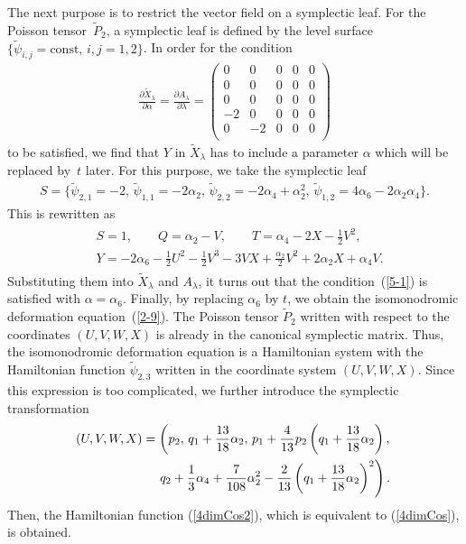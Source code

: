 \documentclass[pdftex]{sigma}
\numberwithin{equation}{section}
\begin{document}
The next purpose is to restrict the vector f\/ield on a symplectic leaf. For the Poisson tensor~$\widetilde{P}_2$, a symplectic leaf is def\/ined by the level surface $\{ \widetilde{\psi}_{i,j} = \text{const},\, i,j=1,2\}$. In order for the condition
\begin{gather}
\frac{\partial \widetilde{X}_\lambda }{\partial \alpha } = \frac{\partial A_\lambda }{\partial \lambda } =\left(
\begin{matrix}
0 & 0 & 0 & 0 & 0 \\
0 & 0 & 0 & 0 & 0 \\
0 & 0 & 0 & 0 & 0 \\
-2 & 0 & 0 & 0 & 0 \\
0 & -2 & 0 & 0 & 0 \\
\end{matrix}\right)\label{5-1}
\end{gather}
to be satisf\/ied, we f\/ind that $Y$ in $\widetilde{X}_\lambda $ has to include a parameter $\alpha $ which will be replaced by~$t$ later. For this purpose, we take the symplectic leaf
\begin{gather*}
S = \big\{ \widetilde{\psi}_{2,1} = -2,\, \widetilde{\psi}_{1,1} = -2\alpha _2,\,\widetilde{\psi}_{2,2} = -2\alpha _4 + \alpha _2^2,\, \widetilde{\psi}_{1,2} = 4\alpha _6 - 2\alpha _2\alpha _4\big \}.
\end{gather*}
This is rewritten as
\begin{gather*}
\begin{split}
& S = 1,\qquad Q = \alpha _2-V,\qquad T = \alpha _4-2X-\frac{1}{2}V^2, \\
& Y = -2\alpha _6-\frac{1}{2}U^2 - \frac{1}{2}V^3 - 3VX + \frac{\alpha _2}{2}V^2 + 2\alpha _2X + \alpha _4V.
\end{split}
\end{gather*}
Substituting them into $\widetilde{X}_\lambda $ and $A_\lambda $, it turns out that the condition~(\ref{5-1}) is satisf\/ied with $\alpha =\alpha _6$. Finally, by replacing $\alpha _6$ by $t$, we obtain the isomonodromic deformation equation~(\ref{2-9}). The Poisson tensor $\widetilde{P}_2$ written with respect to the coordinates $(U,V,W,X)$ is already in the canonical symplectic matrix. Thus, the isomonodromic deformation equation is a Hamiltonian system with the Hamiltonian function $\widetilde{\psi}_{2,3}$ written in the coordinate system $(U,V,W,X)$. Since this expression is too complicated, we further introduce the symplectic transformation
\begin{gather*}
 (U,V,W,X) = \left(p_2,\, q_1+\frac{13}{18}\alpha _2,\, p_1 + \frac{4}{13}p_2\left(q_1+\frac{13}{18}\alpha _2\right)
,\right.\\
\left.\hphantom{(U,V,W,X) =}{} q_2+\frac{1}{3}\alpha _4 + \frac{7}{108}\alpha _2^2-\frac{2}{13}\left(q_1+\frac{13}{18}\alpha _2\right)^2\right).
\end{gather*}
Then, the Hamiltonian function (\ref{4dimCos2}), which is equivalent to (\ref{4dimCos}), is obtained.
\end{document}
